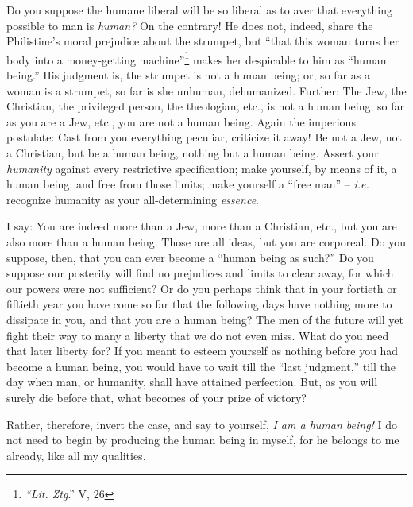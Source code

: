 Do you suppose the humane liberal will be so liberal as to aver that 
everything possible to man is \textit{human?} On the contrary! He does not, 
indeed, share the Philistine's moral prejudice about the strumpet, but ``that 
this woman turns her body into a money-getting 
machine''\footnote{\textit{``Lit. Ztg}.'' V, 26} makes her despicable to 
him as ``human being.'' His judgment is, the strumpet is not a human being; 
or, so far as a woman is a strumpet, so far is she unhuman, dehumanized. 
Further: The Jew, the Christian, the privileged person, the theologian, etc., 
is not a human being; so far as you are a Jew, etc., you are not a human 
being. Again the imperious postulate: Cast from you everything peculiar, 
criticize it away! Be not a Jew, not a Christian, but be a human being, 
nothing but a human being. Assert your \textit{humanity} against every 
restrictive specification; make yourself, by means of it, a human being, and 
free from those limits; make yourself a ``free man'' -- \textit{i.e.} 
recognize humanity as your all-determining \textit{essence}.

I say: You are indeed more than a Jew, more than a Christian, etc., but you 
are also more than a human being. Those are all ideas, but you are corporeal. 
Do you suppose, then, that you can ever become a ``human being as such?'' Do 
you suppose our posterity will find no prejudices and limits to clear away, 
for which our powers were not sufficient? Or do you perhaps think that in your 
fortieth or fiftieth year you have come so far that the following days have 
nothing more to dissipate in you, and that you are a human being? The men of 
the future will yet fight their way to many a liberty that we do not even 
miss. What do you need that later liberty for? If you meant to esteem yourself 
as nothing before you had become a human being, you would have to wait till 
the ``last judgment,'' till the day when man, or humanity, shall have 
attained perfection. But, as you will surely die before that, what becomes of 
your prize of victory?

Rather, therefore, invert the case, and say to yourself, \textit{I am a human 
being!} I do not need to begin by producing the human being in myself, for he 
belongs to me already, like all my qualities.

